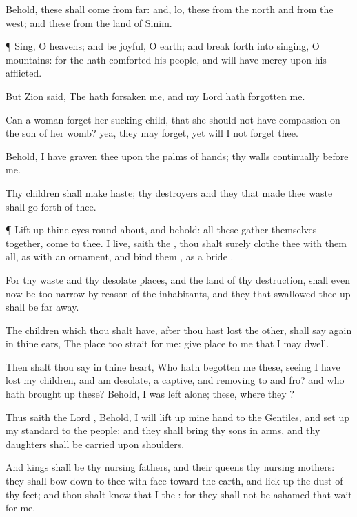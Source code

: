 {Behold, these shall
come from
far: and, lo, these from the
north and from the
west; and these from the
land of
Sinim.


\par }{\PP {}¶
Sing, O
heavens; and be
joyful, O
earth; and break
forth into
singing, O
mountains: for the
{} hath
comforted his
people, and will have
mercy upon his
afflicted.

But
Zion
said, The
{} hath
forsaken me, and my
Lord hath
forgotten me.

Can a
woman
forget her sucking
child, that she should not have
compassion on the
son of her
womb? yea, they may
forget, yet will I not
forget thee.

Behold, I have
graven thee upon the palms of
{}
hands; thy
walls
{}
continually before me.

Thy
children shall make
haste; thy
destroyers and they that made thee
waste shall go
forth of thee.


\par }{\PP {}¶ Lift
up thine
eyes round
about, and
behold: all these gather themselves
together,
{}
come to thee.
{} I
live,
saith the
{}, thou shalt surely
clothe thee with them all, as with an
ornament, and
bind them
{}, as a
bride
{}.

For thy
waste and thy desolate
places, and the
land of thy
destruction, shall even now be too
narrow by reason of the
inhabitants, and they that swallowed thee
up shall be far
away.

The
children which thou shalt have, after thou hast
lost the other, shall
say again in thine
ears, The
place
{} too
strait for me:
give
place to me that I may
dwell.

Then shalt thou
say in thine
heart, Who hath
begotten me these, seeing I have lost my
children, and am
desolate, a
captive, and removing to and
fro? and who hath brought
up these? Behold, I was
left alone; these,
where
{} they
{}?

Thus
saith the
Lord
{}, Behold, I will lift
up mine
hand to the
Gentiles, and set
up my
standard to the
people: and they shall
bring thy
sons in
{}
arms, and thy
daughters shall be
carried upon
{}
shoulders.

And
kings shall be thy nursing
fathers, and their
queens thy nursing
mothers: they shall bow
down to thee with
{}
face toward the
earth, and lick
up the
dust of thy
feet; and thou shalt
know that I
{} the
{}: for they shall not be
ashamed that
wait for me.


}
